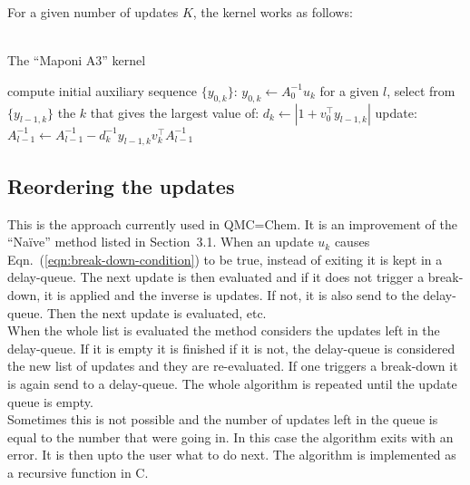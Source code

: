 \documentclass[11pt]{article}
\numberwithin{figure}{section}
\numberwithin{table}{section}
\begin{document}
				For a given number of updates $K$, the kernel works as follows:\\
				\\
				\begin{algorithm}[H]
				\caption{The ``Maponi A3'' kernel}\label{algo:ma3}
				 {
					compute initial auxiliary sequence $\{y_{0,k}\}$: $y_{0,k} \gets A^{-1}_{0}u_k$\;
				}
				 {
					for a given $l$, select from $\{y_{l-1,k}\}$
					the $k$ that gives the largest value of:
					$d_k \gets \left|1+v_0^\top y_{l-1,k}\right|$\;
					update: $A^{-1}_{l-1} \gets A^{-1}_{l-1} - d_k^{-1}y_{l-1,k}v_k^\top A^{-1}_{l-1}$\;
				}
				\end{algorithm}
							
			\subsection{Reordering the updates}\label{sec:reordering}

				This is the approach currently used in QMC=Chem. It is an improvement of the ``Na\"{i}ve'' method listed in Section~3.1. When an update $u_k$ causes Eqn.~(\ref{eqn:break-down-condition}) to be true, instead of exiting it is kept in a delay-queue. The next update is then evaluated and if it does not trigger a break-down, it is applied and the inverse is updates. If not, it is also send to the delay-queue. Then the next update is evaluated, etc.\\
			
				When the whole list is evaluated the method considers the updates left in the delay-queue. If it is empty it is finished if it is not, the delay-queue is considered the new list of updates and they are re-evaluated. If one triggers a break-down it is again send to a delay-queue. The whole algorithm is repeated until the update queue is empty.\\
				
				Sometimes this is not possible and the number of updates left in the queue is equal to the number that were going in. In this case the algorithm exits with an error. It is then upto the user what to do next. The algorithm is implemented as a recursive function in C.\\
								
\end{document}
